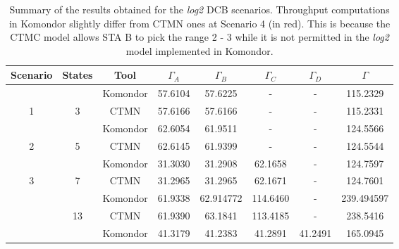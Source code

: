 \documentclass[a4paper]{article}
\begin{document}
\begin{table}[]
\centering
\caption{Summary of the results obtained for the \textit{log2} DCB scenarios. Throughput computations in Komondor slightly differ from CTMN ones at Scenario 4 (in red). This is because the CTMC model allows STA B to pick the range 2 - 3 while it is not permitted in the \textit{log2} model implemented in Komondor.}
\label{table:scenario_4wlans}
\begin{tabular}{|c|c|c|c|c|c|c|c|}
\hline
\textbf{Scenario}                           & \textbf{States}                              & \textbf{Tool} & $\Gamma_A$ & $\Gamma_B$ & $\Gamma_C$ & $\Gamma_D$ & $\Gamma$   \\ \hline
                                            &                                              & Komondor       & 57.6104    & 57.6225    & -          & -          & 115.2329   \\ \cline{3-8} 
\multirow{-2}{*}{1}                         & \multirow{-2}{*}{3}                          & CTMN          & 57.6166    & 57.6166    & -          & -          & 115.2331   \\ \hline
                                            &                                              & Komondor       & 62.6054    & 61.9511    & -          & -          & 124.5566   \\ \cline{3-8} 
\multirow{-2}{*}{2}                         & \multirow{-2}{*}{5}                          & CTMN          & 62.6145    & 61.9399    & -          & -          & 124.5544   \\ \hline
                                            &                                              & Komondor       & 31.3030    & 31.2908    & 62.1658    & -          & 124.7597   \\ \cline{3-8} 
\multirow{-2}{*}{3}                         & \multirow{-2}{*}{7}                          & CTMN          & 31.2965    & 31.2965    & 62.1671    & -          & 124.7601   \\ \hline
\rowcolor[HTML]{FFCCC9} 
\cellcolor[HTML]{FFCCC9}                    & \cellcolor[HTML]{FFCCC9}                     & Komondor       & 61.9338    & 62.914772  & 114.6460   & -          & 239.494597 \\ \cline{3-8} 
\rowcolor[HTML]{FFCCC9} 
\multirow{-2}{*}{\cellcolor[HTML]{FFCCC9}4} & \multirow{-2}{*}{\cellcolor[HTML]{FFCCC9}13} & CTMN          & 61.9390    & 63.1841    & 113.4185   & -          & 238.5416   \\ \hline
                                            &                                              & Komondor       & 41.3179    & 41.2383    & 41.2891    & 41.2491    & 165.0945   \\ \cline{3-8} 

\end{tabular}
\end{table}
\end{document}
